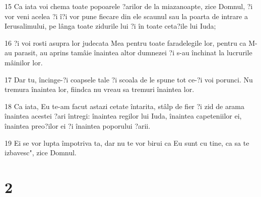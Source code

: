 \par 15 Ca iata voi chema toate popoarele ?arilor de la miazanoapte, zice Domnul, ?i vor veni acelea ?i î?i vor pune fiecare din ele scaunul sau la poarta de intrare a Ierusalimului, pe lânga toate zidurile lui ?i în toate ceta?ile lui Iuda;
\par 16 ?i voi rosti asupra lor judecata Mea pentru toate faradelegile lor, pentru ca M-au parasit, au aprins tamâie înaintea altor dumnezei ?i s-au închinat la lucrurile mâinilor lor.
\par 17 Dar tu, încinge-?i coapsele tale ?i scoala de le spune tot ce-?i voi porunci. Nu tremura înaintea lor, fiindca nu vreau sa tremuri înaintea lor.
\par 18 Ca iata, Eu te-am facut astazi cetate întarita, stâlp de fier ?i zid de arama înaintea acestei ?ari întregi: înaintea regilor lui Iuda, înaintea capeteniilor ei, înaintea preo?ilor ei ?i înaintea poporului ?arii.
\par 19 Ei se vor lupta împotriva ta, dar nu te vor birui ca Eu sunt cu tine, ca sa te izbavesc", zice Domnul.

\chapter{2}

